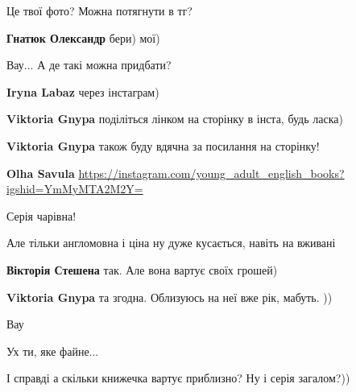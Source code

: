  
 
 
 
 

\qqSecCmt


Це твої фото? Можна потягнути в тг?

\textbf{Гнатюк Олександр} бери) мої)


Вау... А де такі можна придбати?

\begin{itemize} %
\textbf{Iryna Labaz} через інстаграм)

\textbf{Viktoria Gnypa} поділіться лінком на сторінку в інста, будь ласка)

\textbf{Viktoria Gnypa} також буду вдячна за посилання на сторінку!

\textbf{Olha Savula} \url{https://instagram.com/young_adult_english_books?igshid=YmMyMTA2M2Y=}
\end{itemize} %


Серія чарівна!

Але тільки англомовна і ціна ну дуже кусається, навіть на вживані

\begin{itemize} %
\textbf{Вікторія Стешена} так. Але вона вартує своїх грошей)

\textbf{Viktoria Gnypa} та згодна. Облизуюсь на неї вже рік, мабуть. ))
\end{itemize} %


Вау


Ух ти, яке файне...


І справді а скільки книжечка вартує приблизно? Ну і серія загалом?))

